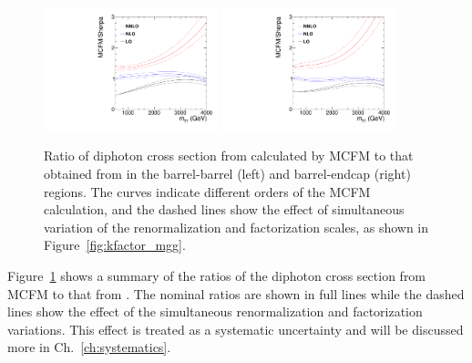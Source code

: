 \begin{figure}[tbp!]
\begin{center}
\includegraphics[angle=0,width=0.45\textwidth]{fig/kfactor_comparison_BB_125GeV_NNPDF.pdf}
\includegraphics[angle=0,width=0.45\textwidth]{fig/kfactor_comparison_BE_125GeV_NNPDF.pdf}
\end{center}
\caption{Ratio of diphoton cross section from calculated by MCFM to that obtained from \SHERPA in the barrel-barrel (left) and barrel-endcap (right) regions. The curves indicate different orders of the MCFM calculation, and the dashed lines show the effect of simultaneous variation of the renormalization and factorization scales, as shown in Figure~\ref{fig:kfactor_mgg}.
}
\label{fig:kfactor_comparison}
\end{figure}

Figure~\ref{fig:kfactor_comparison} shows a summary of the ratios of the diphoton cross section from MCFM to that from \SHERPA. The nominal ratios are shown in full lines while the dashed lines show the effect of the simultaneous renormalization and factorization variations. This effect is treated as a systematic uncertainty and will be discussed more in Ch.~\ref{ch:systematics}.

